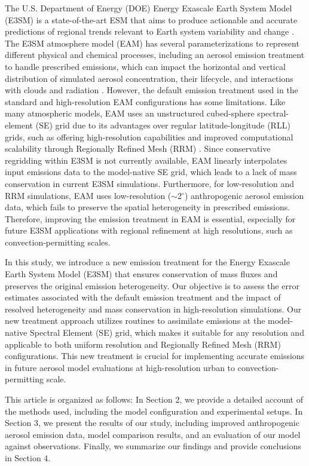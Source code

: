 The U.S. Department of Energy (DOE) Energy Exascale Earth System Model (E3SM) is a state-of-the-art ESM that aims to produce actionable and accurate predictions of regional trends relevant to Earth system variability and change \citep{golaz2019doe}. The E3SM atmosphere model (EAM) has several parameterizations to represent different physical and chemical processes, including an aerosol emission treatment to handle prescribed emissions, which can impact the horizontal and vertical distribution of simulated aerosol concentration, their lifecycle, and interactions with clouds and radiation \citep{burrows2022oceanfilms,liu2012toward,liu2016description,wang2020aerosols}. However, the default emission treatment used in the standard and high-resolution EAM configurations has some limitations. Like many atmospheric models, EAM uses an unstructured cubed-sphere spectral-element (SE) grid due to its advantages over regular latitude-longitude (RLL) grids, such as offering high-resolution capabilities and improved computational scalability through Regionally Refined Mesh (RRM) \citep{taylor2010compatible,dennis2012cam}. Since conservative regridding within E3SM is not currently available, EAM linearly interpolates input emissions data to the model-native SE grid, which leads to a lack of mass conservation in current E3SM simulations. Furthermore, for low-resolution and RRM simulations, EAM uses low-resolution ($\sim$2$^{\circ}$) anthropogenic aerosol emission data, which fails to preserve the spatial heterogeneity in prescribed emissions. Therefore, improving the emission treatment in EAM is essential, especially for future E3SM applications with regional refinement at high resolutions, such as convection-permitting scales.

In this study, we introduce a new emission treatment for the Energy Exascale Earth System Model (E3SM) that ensures conservation of mass fluxes and preserves the original emission heterogeneity. Our objective is to assess the error estimates associated with the default emission treatment and the impact of resolved heterogeneity and mass conservation in high-resolution simulations. Our new treatment approach utilizes routines to assimilate emissions at the model-native Spectral Element (SE) grid, which makes it suitable for any resolution and applicable to both uniform resolution and Regionally Refined Mesh (RRM) configurations. This new treatment is crucial for implementing accurate emissions in future aerosol model evaluations at high-resolution urban to convection-permitting scale. 

This article is organized as follows: In Section 2, we provide a detailed account of the methods used, including the model configuration and experimental setups. In Section 3, we present the results of our study, including improved anthropogenic aerosol emission data, model comparison results, and an evaluation of our model against observations. Finally, we summarize our findings and provide conclusions in Section 4.
